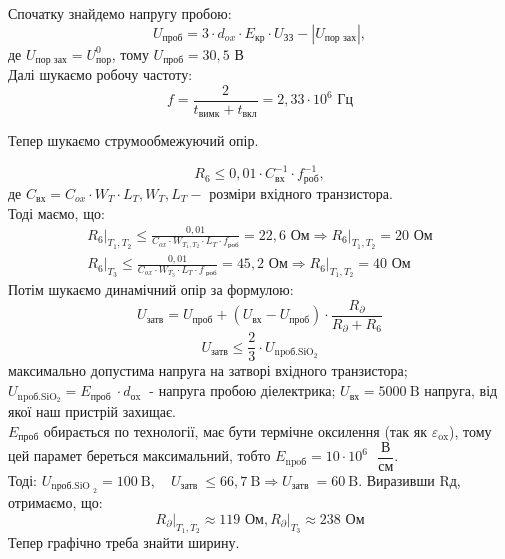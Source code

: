 \documentclass[a4paper,14pt]{extreport}
\begin{document}
Спочатку знайдемо напругу пробою:
\begin{equation}
U_{\text{проб}} = 3 \cdot d_{ox} \cdot E_{\text{кр}} \cdot U_{\text{ЗЗ}} - |U_{\text{пор зах}} |, 
\end{equation}
де $U_{\text{пор зах}}  = U_{\text{пор}}^0$, тому $U_{\text{проб}} =  30,5 $ В\\

Далі шукаємо робочу частоту:
\begin{equation}
	f = \dfrac{2}{t_{\text{вимк}} + t_{\text{вкл}}} = 2,33 \cdot 10^{6} \text{ Гц}
\end{equation}

Тепер шукаємо струмообмежуючий опір.

$$
R_{6} \leq 0,01 \cdot C_{\text{вх}}^{-1} \cdot f_{\text{роб}}^{-1},
$$
де $C_{\text{вх}}=C_{ox} \cdot W_{T} \cdot L_{T}, W_{T}, L_{T}-$ розміри вхідного транзистора.\\
Тоді маємо, що:
$$
\begin{array}{c}
\left.R_{6}\right|_{T_{1}, T_{2}} \leq \frac{0,01}{C_{ox} \cdot W_{T_{1}, T_{2}} \cdot L_{T} \cdot f_{\text{роб}}}=22,\left.6 \text{ Ом} \Rightarrow R_{6}\right|_{T_{1}, T_{2}}=20 \text{ Ом} \\
\left.R_{6}\right|_{T_{3}} \leq \frac{0,01}{C_{o x} \cdot W_{T_{3}} \cdot L_{T} \cdot f_{\text{ роб}}}=45,\left.2 \text{ Ом} \Rightarrow R_{6}\right|_{T_{1}, T_{2}}=40 \text{ Ом}
\end{array}
$$
Потім шукаємо динамічний опір за формулою:
$$
U_{\text{затв}}=U_{\text{проб}}+\left(U_{\text{вх}}-U_{\text{проб}}\right) \cdot \frac{R_{\partial}}{R_{\partial}+R_{6}}
$$
$$
U_{\text{затв}} \leq \frac{2}{3} \cdot U_{\text {npoб.SіO$_2$}}
$$
максимально допустима напруга на затворі вхідного
транзистора; 
$U_{\text{npoб.SіO$_2$}}=E_{\text {проб }} \cdot d_{\text {оx }}$ - напруга пробою діелектрика; $U_{\text {вх}}=5000 \mathrm{~B}$
напруга, від якої наш пристрій захищає. \\
 $E_{\text{проб}}$ обирається по технології, має бути термічне оксилення
  (так як $\varepsilon_{\text{ox}}$), тому цей парамет береться максимальний, тобто $E_{\text{npoб}} = 10 \cdot 10^{6}\text{ } \dfrac{\text{В}}{\text{см}}$. \\


Тоді: $U_{\text {nроб.SiO }_{2}}=100 \mathrm{~B}, \quad U_{\text {затв }} \leq 66,7 \mathrm{~B} \Rightarrow U_{\text {затв }}=60 \mathrm{~B}$. Виразивши Rд, отримаємо, що:
$$
\left.R_{\partial}\right|_{T_{1}, T_{2}} \approx 119  \text{ Ом},\left.R_{\partial}\right|_{T_{3}} \approx 238 \text{ Ом}
$$
Тепер графічно треба знайти ширину.
\end{document}
